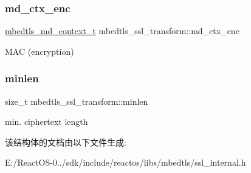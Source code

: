 \subsubsection{\texorpdfstring{md\+\_\+ctx\+\_\+enc}{md\_ctx\_enc}}
{\footnotesize\ttfamily \hyperlink{structmbedtls__md__context__t}{mbedtls\+\_\+md\+\_\+context\+\_\+t} mbedtls\+\_\+ssl\+\_\+transform\+::md\+\_\+ctx\+\_\+enc}

M\+AC (encryption) \mbox{\label{structmbedtls__ssl__transform_aaa43c099c7bc4f20f283362fd2feb619}} 
\subsubsection{\texorpdfstring{minlen}{minlen}}
{\footnotesize\ttfamily size\+\_\+t mbedtls\+\_\+ssl\+\_\+transform\+::minlen}

min. ciphertext length 

该结构体的文档由以下文件生成\+:\begin{DoxyCompactItemize}
\item 
E\+:/\+React\+O\+S-\/0../sdk/include/reactos/libs/mbedtls/ssl\+\_\+internal.\+h\end{DoxyCompactItemize}
